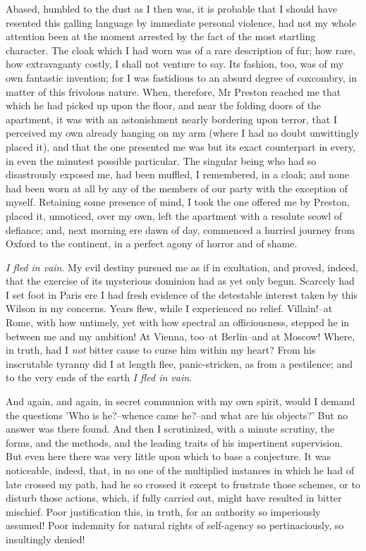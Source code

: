 \documentclass[12pt]{book}
\begin{document}
     Abased, humbled to the dust as I then was, it is probable that
I should have resented this galling language by immediate personal
violence, had not my whole attention been at the moment arrested by
the fact of the most startling character.  The cloak which I had
worn was of a rare description of fur; how rare, how extravaganty 
costly, I shall not venture to say.  Its fashion, too, was of
my own fantastic invention; for I was fastidious to an absurd
degree of coxcombry, in matter of this frivolous nature.  When,
therefore, Mr Preston reached me that which he had picked up upon
the floor, and near the folding doors of the apartment, it was with
an astonishment nearly bordering upon terror, that I perceived my
own already hanging on my arm (where I had no doubt unwittingly
placed it), and that the one presented me was but its exact
counterpart in every, in even the minutest possible particular. 
The singular being who had so disastrously exposed me, had been
muffled, I remembered, in a cloak; and none had been worn at all by
any of the members of our party with the exception of myself. 
Retaining some presence of mind, I took the one offered me by
Preston, placed it, unnoticed, over my own, left the apartment with
a resolute scowl of defiance; and, next morning ere dawn of day,
commenced a hurried journey from Oxford to the continent, in a
perfect agony of horror and of shame.

     \emph{I fled in vain}.  My evil destiny pursued me as if in
exultation, and proved, indeed, that the exercise of its mysterious
dominion had as yet only begun.  Scarcely had I set foot in Paris
ere I had fresh evidence of the detestable interest taken by this
Wilson in my concerns.  Years flew, while I experienced no relief. 
Villain!--at Rome, with how untimely, yet with how spectral an
officiousness, stepped he in between me and my ambition!  At
Vienna, too--at Berlin--and at Moscow!  Where, in truth, had I 
\emph{not} bitter cause to curse him within my heart?  From his
inscrutable tyranny did I at length flee, panic-stricken, as from
a pestilence; and to the very ends of the earth \emph{I fled in vain}.

     And again, and again, in secret communion with my own spirit,
would I demand the questions 'Who is he?--whence came he?--and what
are his objects?'  But no answer was there found.  And then I
scrutinized, with a minute scrutiny, the forms, and the methods,
and the leading traits of his impertinent supervision.  But even
here there was very little upon which to base a conjecture.  It was
noticeable, indeed, that, in no one of the multiplied instances in
which he had of late crossed my path, had he so crossed it except
to frustrate those schemes, or to disturb those actions, which, if
fully carried out, might have resulted in bitter mischief. 
Poor justification this, in truth, for an authority so imperiously
assumed!  Poor indemnity for natural rights of self-agency so
pertinaciously, so insultingly denied!
\end{document}
